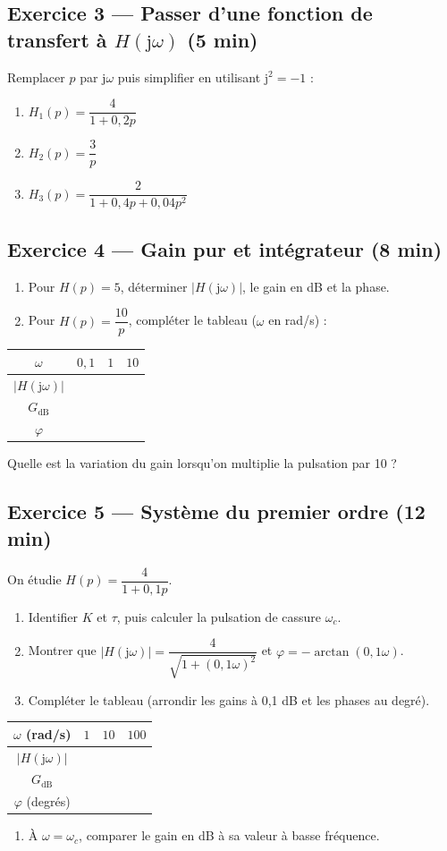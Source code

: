 \documentclass[11pt,a4paper]{article}
\newcommand{\rep}[1][1.1cm]{\par\vspace{#1}}
\newcommand{\dd}{\mathrm{dB}}
\newcommand{\jw}{\mathrm{j}\omega}
\newcommand{\ex}[2]{\subsection*{Exercice #1 --- #2}}
\begin{document}
\ex{3}{Passer d'une fonction de transfert à $H(\mathrm{j}\omega)$ (5 min)}
Remplacer $p$ par $\mathrm{j}\omega$ puis simplifier en utilisant $\mathrm{j}^2=-1$ :
\begin{enumerate}[label=\alph*)]
\item $H_1(p)=\dfrac{4}{1+0{,}2p}$
\item $H_2(p)=\dfrac{3}{p}$
\item $H_3(p)=\dfrac{2}{1+0{,}4p+0{,}04p^2}$
\end{enumerate}

\ex{4}{Gain pur et intégrateur (8 min)}
\begin{enumerate}[label=\alph*)]
\item Pour $H(p)=5$, déterminer $|H(\jw)|$, le gain en dB et la phase.
\item Pour $H(p)=\dfrac{10}{p}$, compléter le tableau (\(\omega\) en rad/s) :
\end{enumerate}
\begin{center}\begin{tabular}{|c|c|c|c|}\hline
$\omega$ & $0{,}1$ & $1$ & $10$ \\ \hline
$|H(\jw)|$ & \rule{0pt}{0.85cm} & & \\ \hline
$G_{\dd}$ & \rule{0pt}{0.85cm} & & \\ \hline
$\varphi$ & \rule{0pt}{0.85cm} & & \\ \hline
\end{tabular}\end{center}
Quelle est la variation du gain lorsqu'on multiplie la pulsation par 10 ? \rep[0.8cm]

\ex{5}{Système du premier ordre (12 min)}
On étudie \(H(p)=\dfrac{4}{1+0{,}1p}\).
\begin{enumerate}[label=\alph*)]
\item Identifier $K$ et $\tau$, puis calculer la pulsation de cassure $\omega_c$.
\item Montrer que \( |H(\jw)|=\dfrac{4}{\sqrt{1+(0{,}1\omega)^2}}\) et \(\varphi=-\arctan(0{,}1\omega)\).
\item Compléter le tableau (arrondir les gains à 0,1 dB et les phases au degré).
\end{enumerate}
\begin{center}\begin{tabular}{|c|c|c|c|}\hline
$\omega$ (rad/s) & $1$ & $10$ & $100$ \\ \hline
$|H(\jw)|$ & \rule{0pt}{0.9cm} & & \\ \hline
$G_{\dd}$ & \rule{0pt}{0.9cm} & & \\ \hline
$\varphi$ (degrés) & \rule{0pt}{0.9cm} & & \\ \hline
\end{tabular}\end{center}
\begin{enumerate}[label=\alph*),start=4]
\item À $\omega=\omega_c$, comparer le gain en dB à sa valeur à basse fréquence.
\end{enumerate}
\end{document}

